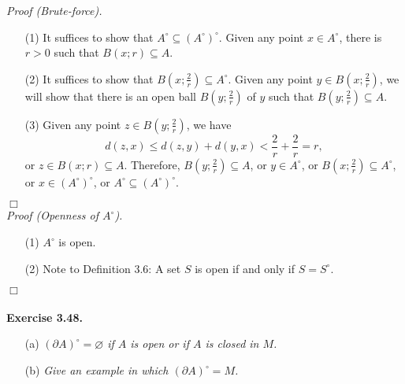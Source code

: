 \documentclass{article}
\begin{document}
\emph{Proof (Brute-force).}
\begin{enumerate}
\item[(1)]
It suffices to show that $A^{\circ} \subseteq (A^{\circ})^{\circ}$.
Given any point $x \in A^{\circ}$, there is $r > 0$ such that $B(x;r) \subseteq A$.
\item[(2)]
It suffices to show that $B\left(x;\frac{2}{r}\right) \subseteq A^{\circ}$.
Given any point $y \in B\left(x;\frac{2}{r}\right)$,
we will show that there is an open ball $B\left(y;\frac{2}{r}\right)$ of $y$
such that $B\left(y;\frac{2}{r}\right) \subseteq A$.
\item[(3)]
Given any point $z \in B\left(y;\frac{2}{r}\right)$, we have
$$d(z,x) \leq d(z,y) + d(y,x) < \frac{2}{r} + \frac{2}{r} = r,$$
or $z \in B(x;r) \subseteq A$.
Therefore, $B\left(y;\frac{2}{r}\right) \subseteq A$,
or $y \in A^{\circ}$,
or $B\left(x;\frac{2}{r}\right) \subseteq A^{\circ}$,
or $x \in (A^{\circ})^{\circ}$,
or $A^{\circ} \subseteq (A^{\circ})^{\circ}$.
\end{enumerate}
$\Box$ \\

\emph{Proof (Openness of $A^{\circ}$).}
\begin{enumerate}
\item[(1)]
$A^{\circ}$ is open.
\item[(2)]
Note to Definition 3.6: A set $S$ is open if and only if $S = S^{\circ}$.
\end{enumerate}
$\Box$ \\\\






\textbf{Exercise 3.48.}
\begin{enumerate}
\item[(a)]
\emph{$(\partial A)^{\circ} = \varnothing$ if $A$ is open or if $A$ is closed in $M$. }
\item[(b)]
\emph{Give an example in which $(\partial A)^{\circ} = M$. } \\
\end{enumerate}
\end{document}
